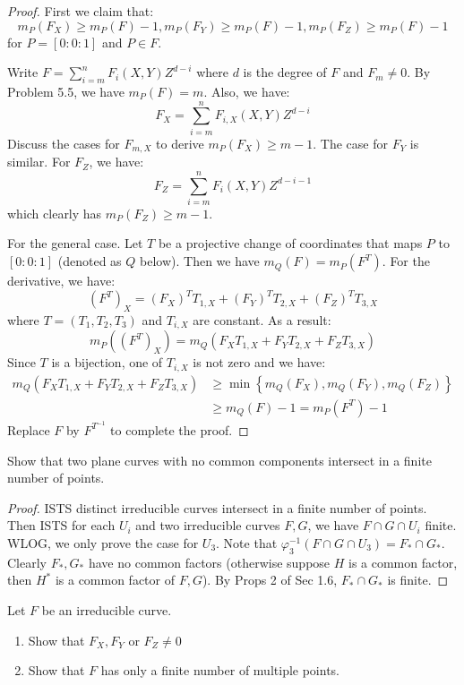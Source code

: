 \documentclass{solution}
\begin{document}
\begin{proof}
    First we claim that:
    $$m_P(F_X) \ge m_P(F) - 1, m_P(F_Y) \ge m_P(F) - 1, m_P(F_Z) \ge m_P(F) - 1$$
    for $P = [0:0:1]$ and $P \in F$.

    Write $F = \sum\limits_{i = m}^{n} F_i(X, Y) Z^{d - i}$ where $d$ is the degree of $F$ and $F_m \ne 0$. By Problem 5.5, we have $m_{P}(F) = m$. Also, we have:
    $$F_X = \sum\limits_{i = m}^{n} F_{i, X}(X, Y) Z^{d - i}$$
    Discuss the cases for $F_{m, X}$ to derive $m_P(F_X) \ge m - 1$. The case for $F_Y$ is similar. For $F_Z$, we have:
    $$F_Z = \sum\limits_{i = m}^{n} F_{i}(X, Y) Z^{d - i - 1}$$
    which clearly has $m_P(F_Z) \ge m - 1$.

    For the general case. Let $T$ be a projective change of coordinates that maps $P$ to $[0:0:1]$ (denoted as $Q$ below). Then we have $m_Q(F) = m_P(F^T)$. For the derivative, we have:
    $$(F^T)_X = (F_X)^T T_{1, X} + (F_Y)^T T_{2, X} + (F_Z)^T T_{3, X}$$
    where $T = (T_1, T_2, T_3)$ and $T_{i, X}$ are constant. As a result:
    $$m_P((F^T)_X) = m_Q(F_X T_{1, X} + F_Y T_{2, X} + F_Z T_{3, X})$$
    Since $T$ is a bijection, one of $T_{i, X}$ is not zero and we have:
    $$
        \begin{aligned}
        m_Q(F_X T_{1, X} + F_Y T_{2, X} + F_Z T_{3, X}) &\ge \min \left\lbrace m_Q(F_X), m_Q(F_Y), m_Q(F_Z) \right\rbrace \\
        &\ge m_Q(F) - 1 = m_P(F^T) - 1
        \end{aligned}
    $$
    Replace $F$ by $F^{T ^{-1}}$ to complete the proof.
\end{proof}

\begin{problem}{5.7}
    Show that two plane curves with no common components intersect in a finite number of points.
\end{problem}

\begin{proof}
    ISTS distinct irreducible curves intersect in a finite number of points. Then ISTS for each $U_i$ and two irreducible curves $F, G$, we have $F \cap G \cap U_i$ finite. WLOG, we only prove the case for $U_{3}$. Note that $\varphi_{3} ^{-1}(F \cap G \cap U_3) = F_* \cap G_*$. Clearly $F_*, G_*$ have no common factors (otherwise suppose $H$ is a common factor, then $H^*$ is a common factor of $F, G$). By Props 2 of Sec 1.6, $F_* \cap G_*$ is finite.
\end{proof}

\begin{problem}{5.8}
    Let $F$ be an irreducible curve.
    \begin{enumerate}
        \item Show that $F_X, F_Y$ or $F_Z \ne 0$
        \item Show that $F$ has only a finite number of multiple points.
    \end{enumerate}
\end{problem}
\end{document}
